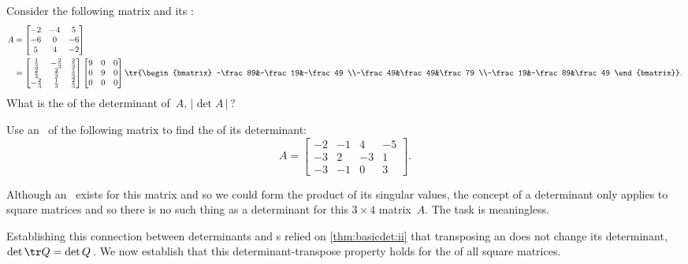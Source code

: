 \begin{activity}
Consider the following matrix and its \svd:
\begin{align*}
A&=\begin{bmatrix} -2&-4&5
\\-6&0&-6
\\5&4&-2 \end{bmatrix}
\\&
=\begin{bmatrix} \frac13&-\frac23&\frac23
\\\frac23&\frac23&\frac13
\\-\frac23&\frac13&\frac23 \end{bmatrix}
\begin{bmatrix} 9&0&0\\0&9&0\\0&0&0 \end{bmatrix}
\tr{\begin{bmatrix} -\frac89&-\frac19&-\frac49
\\-\frac49&\frac49&\frac79
\\-\frac19&-\frac89&\frac49 \end{bmatrix}}.
\end{align*}
What is the  of the determinant of~\(A\), \(|\det A\,|\)\,?
\end{activity}




\begin{example} 
Use an \svd\ of the following matrix to find the  of its determinant:
\begin{equation*}
A=\begin{bmatrix}-2&-1&4&-5
\\-3&2&-3&1
\\-3&-1&0&3
\end{bmatrix}.
\end{equation*}
\begin{solution} 
Although an \svd\ exists for this matrix and so we could form the product of its singular values, the concept of a determinant only applies to square matrices and so there is no such thing as a determinant for this \(3\times4\) matrix~\(A\).
The task is meaningless.
\end{solution}
\end{example}




Establishing this connection between determinants and s relied on \cref{thm:basicdet:ii} that transposing an  does not change its determinant, \(\det\tr Q=\det Q\)\,.
We now establish that this determinant-transpose property holds for the  of all square matrices.


